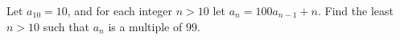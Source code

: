 Let $a_{10} = 10$, and for each integer $n >10$ let $a_n = 100a_{n - 1} + n$. Find the least $n > 10$ such that $a_n$ is a multiple of $99$.